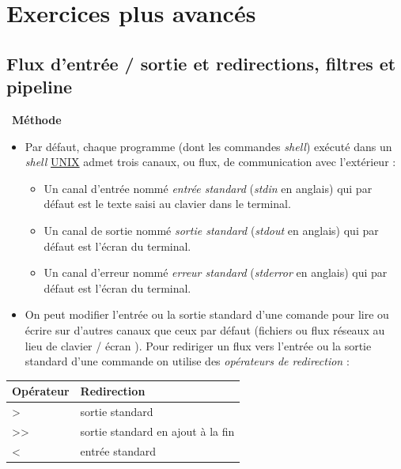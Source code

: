 \documentclass[
  11pt,
]{article}
\providecommand{\tightlist}{%
  \setlength{\itemsep}{0pt}\setlength{\parskip}{0pt}}
\newcounter{prog}
\newenvironment{methode}[1]
{\par \medskip    \noindent  
 \begin {bclogo}[arrondi =0.1,logo=\bcoutil, marge=4,noborder = true] {~\textbf{Méthode}   {\itshape #1} }  \par}
{
\end{bclogo}
 \par \bigskip }
\begin{document}
\hypertarget{exercices-plus-avancuxe9s}{%
\section{Exercices plus avancés}\label{exercices-plus-avancuxe9s}}

\hypertarget{flux-dentruxe9e-sortie-et-redirections-filtres-et-pipeline}{%
\subsection{Flux d'entrée / sortie et redirections, filtres et
pipeline}\label{flux-dentruxe9e-sortie-et-redirections-filtres-et-pipeline}}

\begin{methode}{}

\begin{itemize}
\item
  Par défaut, chaque programme (dont les commandes \emph{shell}) exécuté
  dans un \emph{shell} \href{https://fr.wikipedia.org/wiki/Unix}{UNIX}
  admet trois canaux, ou flux, de communication avec l'extérieur :

  \begin{itemize}
  \tightlist
  \item
    Un canal d'entrée nommé \emph{entrée standard} (\emph{stdin} en
    anglais) qui par défaut est le texte saisi au clavier dans le
    terminal.
  \item
    Un canal de sortie nommé \emph{sortie standard} (\emph{stdout} en
    anglais) qui par défaut est l'écran du terminal.
  \item
    Un canal d'erreur nommé \emph{erreur standard} (\emph{stderror} en
    anglais) qui par défaut est l'écran du terminal.
  \end{itemize}
\item
  On peut modifier l'entrée ou la sortie standard d'une comande pour
  lire ou écrire sur d'autres canaux que ceux par défaut (fichiers ou
  flux réseaux au lieu de clavier / écran ). Pour rediriger un flux vers
  l'entrée ou la sortie standard d'une commande on utilise des
  \emph{opérateurs de redirection} :
\end{itemize}

\begin{longtable}[]{@{}ll@{}}
\toprule
Opérateur & Redirection\tabularnewline
\midrule
\endhead
\textgreater{} & sortie standard\tabularnewline
\textgreater{}\textgreater{} & sortie standard en ajout à la
fin\tabularnewline
\textless{} & entrée standard\tabularnewline
\bottomrule
\end{longtable}


\end{methode}
\end{document}
